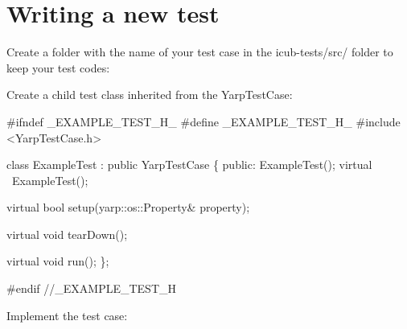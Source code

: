 \hypertarget{writing-and-running_writing-new-tests}{}\section{Writing a new test}\label{writing-and-running_writing-new-tests}
Create a folder with the name of your test case in the {\ttfamily icub-\/tests/src/} folder to keep your test codes\-:




Create a child test class inherited from the {\ttfamily Yarp\-Test\-Case}\-:


\begin{DoxyCode}
\textcolor{preprocessor}{#ifndef \_EXAMPLE\_TEST\_H\_}
\textcolor{preprocessor}{}\textcolor{preprocessor}{#define \_EXAMPLE\_TEST\_H\_}
\textcolor{preprocessor}{}
\textcolor{preprocessor}{#include <YarpTestCase.h>}

\textcolor{keyword}{class }ExampleTest : \textcolor{keyword}{public} YarpTestCase \{
\textcolor{keyword}{public}:
    ExampleTest();
    \textcolor{keyword}{virtual} ~ExampleTest();

    \textcolor{keyword}{virtual} \textcolor{keywordtype}{bool} setup(yarp::os::Property& property);

    \textcolor{keyword}{virtual} \textcolor{keywordtype}{void} tearDown();

    \textcolor{keyword}{virtual} \textcolor{keywordtype}{void} run();
\};

\textcolor{preprocessor}{#endif //\_EXAMPLE\_TEST\_H}
\end{DoxyCode}


Implement the test case\-:


